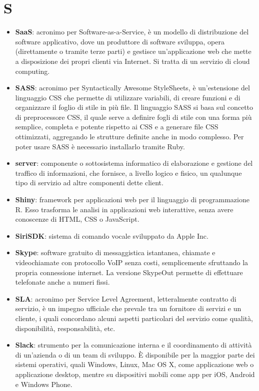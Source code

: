 \section{S}
\begin{itemize}
	\item \textbf{SaaS}: acronimo per Software-as-a-Service, è un modello di distribuzione del software applicativo, dove un produttore di software sviluppa, opera (direttamente o tramite terze parti) e gestisce un'applicazione web che mette a disposizione dei propri clienti via Internet. Si tratta di un servizio di cloud computing.
	\item \textbf{SASS}: acronimo per Syntactically Awesome StyleSheets, è un'estensione del linguaggio CSS che permette di utilizzare variabili, di creare funzioni e di organizzare il foglio di stile in più file. Il linguaggio SASS si basa sul concetto di preprocessore CSS, il quale serve a definire fogli di stile con una forma più semplice, completa e potente rispetto ai CSS e a generare file CSS ottimizzati, aggregando le strutture definite anche in modo complesso. Per poter usare SASS è necessario installarlo tramite Ruby.
	\item \textbf{server}: componente o sottosistema informatico di elaborazione e gestione del traffico di informazioni, che fornisce, a livello logico e fisico, un qualunque tipo di servizio ad altre componenti dette client.
	\item \textbf{Shiny}: framework per applicazioni web per il linguaggio di programmazione R. Esso trasforma le analisi in applicazioni web interattive, senza avere conoscenze di HTML, CSS o JavaScript.
	\item \textbf{SiriSDK}: sistema di comando vocale sviluppato da Apple Inc.
	\item \textbf{Skype}: software gratuito di messaggistica istantanea, chiamate e videochiamate con protocollo VoIP senza costi, semplicemente sfruttando la propria connessione internet. La versione SkypeOut permette di effettuare telefonate anche a numeri fissi.
	\item \textbf{SLA}: acronimo per Service Level Agreement, letteralmente contratto di servizio, è un impegno ufficiale che prevale tra un fornitore di servizi e un cliente, i quali concordano alcuni aspetti particolari del servizio come qualità, disponibilità, responsabilità, etc.
	\item \textbf{Slack}: strumento per la comunicazione interna e il coordinamento di attività di un'azienda o di un team di sviluppo. \MakeUppercase{è} disponibile per la maggior parte dei sistemi operativi, quali Windows, Linux, Mac OS X, come applicazione web o applicazione desktop, mentre su dispositivi mobili come app per iOS, Android e Windows Phone.

\end{itemize}
